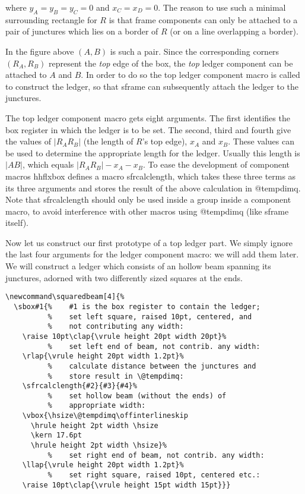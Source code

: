 \documentclass[11pt]{article}
\makeatletter
\def\packagename#1{{\sffamily #1}}     %
\def\macroname#1{{\ttfamily\@ttbs#1}}  %
\def\hhflxbox{\packagename{hhflxbox}\xspace}
\def\<#1>{\macroname{#1}}
\makeatother
\begin{document}
where $y_A = y_B = y_C = 0$ and $x_C = x_D = 0$. The reason to use
such a minimal surrounding rectangle for $R$ is that frame components
can only be attached to a pair of junctures which lies on a border
of $R$ (or on a line overlapping a border).

In the figure above $(A,B)$ is such a pair. Since the corresponding
corners $(R_A,R_B)$ represent the \emph{top} edge of the box, the
\emph{top} ledger component can be attached to $A$ and $B$. In order
to do so the top ledger component macro is called to construct the ledger,
so that \<sframe> can subsequently attach the ledger to the junctures.

The top ledger component macro gets eight arguments. The first identifies
the box register in which the ledger is to be set. The second, third
and fourth give the values of $|R_AR_B|$ (the length of $R$'s top edge),
$x_A$ and $x_B$. These values can be used to determine the appropriate
length for the ledger. Usually this length is $|AB|$, which equals
$|R_AR_B| - x_A - x_B$.
To ease the development of component macros \hhflxbox defines
a macro \<sfrcalclength>, which takes these three terms as its
three arguments and stores the result of the above calculation in
\<@tempdimq>. Note that \<sfrcalclength> should only be used inside
a group inside a component macro, to avoid interference with other
macros using \<@tempdimq> (like \<sframe> itself).

Now let us construct our first prototype of a top ledger part. We simply
ignore the last four arguments for the ledger component macro: we will
add them later. We will construct a ledger which consists of an
hollow beam spanning its junctures, adorned with two differently
sized squares at the ends.

\begin{verbatim}
\newcommand\squaredbeam[4]{%
  \sbox#1{%    #1 is the box register to contain the ledger;
          %    set left square, raised 10pt, centered, and
          %    not contributing any width:
    \raise 10pt\clap{\vrule height 20pt width 20pt}%
          %    set left end of beam, not contrib. any width:
    \rlap{\vrule height 20pt width 1.2pt}%
          %    calculate distance between the junctures and
          %    store result in \@tempdimq:
    \sfrcalclength{#2}{#3}{#4}%
          %    set hollow beam (without the ends) of
          %    appropriate width:
    \vbox{\hsize\@tempdimq\offinterlineskip
      \hrule height 2pt width \hsize
      \kern 17.6pt
      \hrule height 2pt width \hsize}%
          %    set right end of beam, not contrib. any width:
    \llap{\vrule height 20pt width 1.2pt}%
          %    set right square, raised 10pt, centered etc.:
    \raise 10pt\clap{\vrule height 15pt width 15pt}}}
\end{verbatim}
\newcommand\squaredbeam[1]{\hbox{%
    \raise 10pt\clap{\vrule height 20pt width 20pt}%
    \rlap{\vrule height 20pt width 1.2pt}%
    \vbox{\hsize #1\offinterlineskip
      \hrule height 1.2pt width \hsize
      \kern 17.6pt
      \hrule height 1.2pt width \hsize}%
    \llap{\vrule height 20pt width 1.2pt}%
    \raise 10pt\clap{\vrule height 15pt width 15pt}}}
\end{document}
